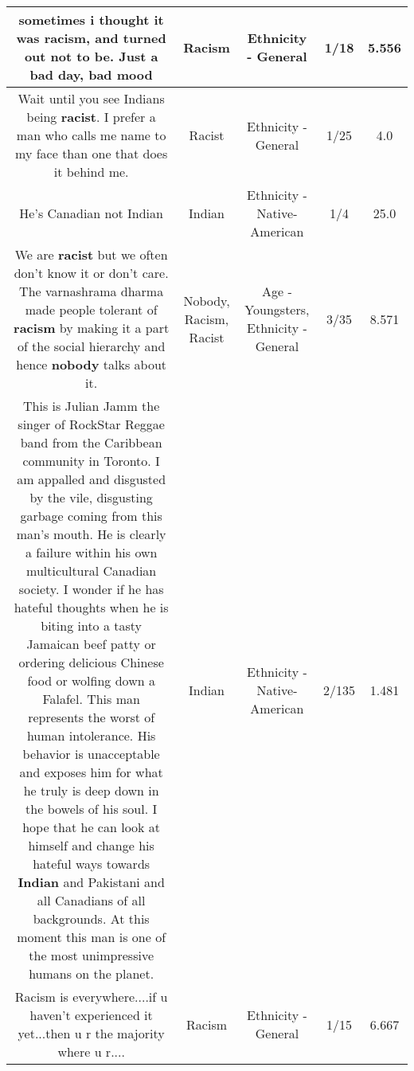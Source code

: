 \documentclass[11pt]{article}
\newlength\mylength
\begin{document}
\begin{center}
\begin{longtable}{|C{.65\mylength}|C{.30\mylength}|C{.12\mylength}|C{.12\mylength}|C{.12\mylength}|}
  \small sometimes i thought it was \textbf{racism}, and turned out not to be. Just a bad day, bad mood\normalsize   & Racism & Ethnicity - General & 1/18 & 5.556 \\  \hline
  \small Wait until you see Indians being \textbf{racist}. I prefer a man who calls me name to my face than one that does it behind me.\normalsize   & Racist & Ethnicity - General & 1/25 & 4.0 \\  \hline
  \small He's Canadian not Indian\normalsize   & Indian & Ethnicity - Native-American & 1/4 & 25.0 \\  \hline
  \small We are \textbf{racist} but we often don't know it or don't care. The varnashrama dharma made people tolerant of \textbf{racism} by making it a part of the social hierarchy and hence \textbf{nobody} talks about it.\normalsize   & Nobody, Racism, Racist & Age - Youngsters, Ethnicity - General & 3/35 & 8.571 \\  \hline
  \small This is Julian Jamm the singer of RockStar Reggae band from the Caribbean community in Toronto. I am appalled and disgusted by the vile, disgusting garbage coming from this man's mouth. He is clearly a failure within his own multicultural Canadian society. I wonder if he has hateful thoughts when he is biting into a tasty Jamaican beef patty or ordering delicious Chinese food or wolfing down a Falafel. This man represents the worst of human intolerance. His behavior is unacceptable and exposes him for what he truly is deep down in the bowels of his soul. I hope that he can look at himself and change his hateful ways towards \textbf{Indian} and Pakistani and all Canadians of all backgrounds. At this moment this man is one of the most unimpressive humans on the planet.\normalsize   & Indian & Ethnicity - Native-American & 2/135 & 1.481 \\  \hline
  \small Racism is everywhere....if u haven't experienced it yet...then u r the majority where u r....\normalsize   & Racism & Ethnicity - General & 1/15 & 6.667 \\  \hline

\end{longtable}
\end{center}
\end{document}
